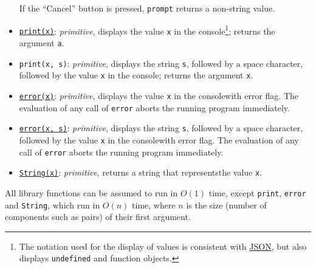 \begin{itemize}
If the ``Cancel'' button is pressed, \texttt{prompt} returns a non-string value.
\item \href{https://sourceacademy.org/sicpjs/1.2.6\#footnote-7}{\texttt{print(x)}}: \textit{primitive}, displays the value \texttt{x} in the console\footnote{The notation used for the display of values is consistent with \href{http://www.ecma-international.org/publications/files/ECMA-ST/ECMA-404.pdf}{\color{DarkBlue}JSON}, but also displays \texttt{undefined} and function objects.}; returns the argument \texttt{a}.
\item \texttt{print(x, s)}: \textit{primitive}, displays the string \texttt{s}, followed by a space character, followed by the value \texttt{x} in the console\footnotemark[\value{footnote}]; returns the argument \texttt{x}.
\item \href{https://sourceacademy.org/sicpjs/1.2.6\#footnote-7}{\texttt{error(x)}}: \textit{primitive}, displays the value \texttt{x} in the console\footnotemark[\value{footnote}] with error flag. The evaluation
  of any call of \texttt{error} aborts the running program immediately.
\item \href{https://sourceacademy.org/sicpjs/2.1.3\#footnote-2}{\texttt{error(x, s)}}: \textit{primitive}, displays the string \texttt{s}, followed by a space character, followed by the value \texttt{x} in the console\footnotemark[\value{footnote}] with error flag. The evaluation
  of any call of \texttt{error} aborts the running program immediately.
\item \href{https://sourceacademy.org/sicpjs/3.3.4\#p24}{\lstinline{String(x)}}: \textit{primitive}, returns a string that represents\footnotemark[\value{footnote}] the value \texttt{x}. 
\end{itemize}
All library functions can be assumed to run
in $O(1)$ time, except \texttt{print}, \texttt{error} and \texttt{String}, 
which run in $O(n)$ time, where $n$ is
the size (number of components such as pairs) of their first argument.
